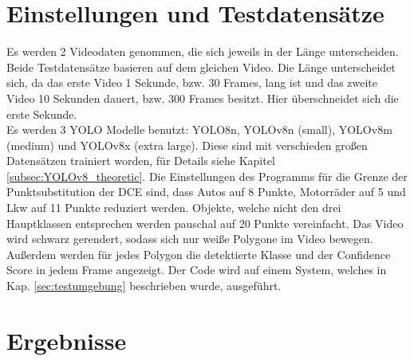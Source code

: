 \section{Einstellungen und Testdatensätze}
{%
	Es werden 2 Videodaten genommen, die sich jeweils in der Länge unterscheiden. Beide Testdatensätze basieren auf dem gleichen Video. Die Länge unterscheidet sich, da das erste Video 1 Sekunde, bzw. 30 Frames, lang ist und das zweite Video 10 Sekunden dauert, bzw. 300 Frames besitzt. Hier überschneidet sich die erste Sekunde. \\
	Es werden 3 YOLO Modelle benutzt: YOLO8n, YOLOv8n (small), YOLOv8m (medium) und YOLOv8x (extra large). Diese sind mit verschieden großen Datensätzen trainiert worden, für Details siehe Kapitel \ref{subsec:YOLOv8_theoretic}.
	Die Einstellungen des Programms für die Grenze der Punktsubstitution der DCE sind, dass Autos auf 8 Punkte, Motorräder auf 5 und Lkw auf 11 Punkte reduziert werden.
	Objekte, welche nicht den drei Hauptklassen entsprechen werden pauschal auf 20 Punkte vereinfacht. Das Video wird  schwarz gerendert, sodass sich nur weiße Polygone im Video bewegen. Außerdem werden für jedes Polygon die detektierte Klasse und der Confidence Score in jedem Frame angezeigt.
	Der Code wird auf einem System, welches in Kap. \ref{sec:testumgebung} beschrieben wurde, ausgeführt.

}
\section{Ergebnisse\label{sec:Ergebnisse}}  

